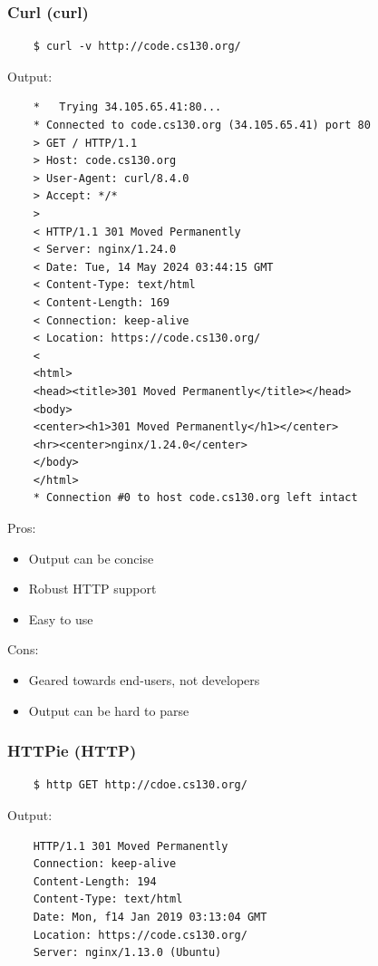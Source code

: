 \documentclass{article}
\begin{document}
\subsubsection{Curl (curl)}

\begin{verbatim}
    $ curl -v http://code.cs130.org/ 
\end{verbatim}

Output:
\begin{verbatim}
    *   Trying 34.105.65.41:80...
    * Connected to code.cs130.org (34.105.65.41) port 80
    > GET / HTTP/1.1
    > Host: code.cs130.org
    > User-Agent: curl/8.4.0
    > Accept: */*
    > 
    < HTTP/1.1 301 Moved Permanently
    < Server: nginx/1.24.0
    < Date: Tue, 14 May 2024 03:44:15 GMT
    < Content-Type: text/html
    < Content-Length: 169
    < Connection: keep-alive
    < Location: https://code.cs130.org/
    < 
    <html>
    <head><title>301 Moved Permanently</title></head>
    <body>
    <center><h1>301 Moved Permanently</h1></center>
    <hr><center>nginx/1.24.0</center>
    </body>
    </html>
    * Connection #0 to host code.cs130.org left intact
\end{verbatim}

Pros:
\begin{itemize}
    \item Output can be concise
    \item Robust HTTP support 
    \item Easy to use 
\end{itemize}
Cons:
\begin{itemize}
    \item Geared towards end-users, not developers
    \item Output can be hard to parse 
\end{itemize}

\subsubsection{HTTPie (HTTP)}

\begin{verbatim}
    $ http GET http://cdoe.cs130.org/
\end{verbatim}

Output:
\begin{verbatim}
    HTTP/1.1 301 Moved Permanently
    Connection: keep-alive 
    Content-Length: 194 
    Content-Type: text/html 
    Date: Mon, f14 Jan 2019 03:13:04 GMT 
    Location: https://code.cs130.org/ 
    Server: nginx/1.13.0 (Ubuntu)
\end{verbatim}
\end{document}
